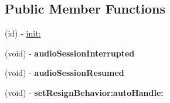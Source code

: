 \subsection*{Public Member Functions}
\begin{DoxyCompactItemize}
\item 
(id) -\/ \hyperlink{interface_c_d_audio_manager_ae2d8ef3daed8297ee37cd14b67687407}{init\-:}
\item 
\hypertarget{interface_c_d_audio_manager_aeeaf362faad4417ac15d22e0862c1641}{(void) -\/ {\bfseries audio\-Session\-Interrupted}}\label{interface_c_d_audio_manager_aeeaf362faad4417ac15d22e0862c1641}

\item 
\hypertarget{interface_c_d_audio_manager_a844dd2990cbadb04e35364abed23f690}{(void) -\/ {\bfseries audio\-Session\-Resumed}}\label{interface_c_d_audio_manager_a844dd2990cbadb04e35364abed23f690}

\item 
\hypertarget{interface_c_d_audio_manager_aa798467094d7ba507839edbeb54b8b56}{(void) -\/ {\bfseries set\-Resign\-Behavior\-:auto\-Handle\-:}}\label{interface_c_d_audio_manager_aa798467094d7ba507839edbeb54b8b56}


\end{DoxyCompactItemize}
